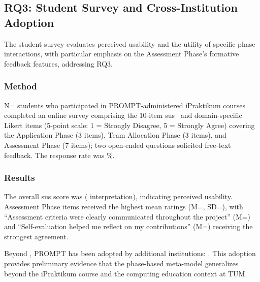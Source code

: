 \subsection{RQ3: Student Survey and Cross-Institution Adoption}

The student survey evaluates perceived usability and the utility of specific phase interactions, with particular emphasis on the Assessment Phase's formative feedback features, addressing RQ3.

\subsubsection{Method}

N=\missing{} students who participated in PROMPT-administered iPraktikum courses completed an online survey comprising the 10-item \acrfull{sus}~\cite{sus} and \missing{} domain-specific Likert items (5-point scale: 1 = Strongly Disagree, 5 = Strongly Agree) covering the Application Phase (3 items), Team Allocation Phase (3 items), and Assessment Phase (7 items);
two open-ended questions solicited free-text feedback.
The response rate was \missing{}\%.

\subsubsection{Results}

\begin{findingBox}
The overall \acrshort{sus} score was \missing{} (\missing{} interpretation), indicating \missing{} perceived usability.
Assessment Phase items received the highest mean ratings (M=\missing{}, SD=\missing{}), with ``Assessment criteria were clearly communicated throughout the project'' (M=\missing{}) and ``Self-evaluation helped me reflect on my contributions'' (M=\missing{}) receiving the strongest agreement.
\end{findingBox}

Beyond \university{}, PROMPT has been adopted by \missing{} additional institutions: \missing{}.
This adoption provides preliminary evidence that the phase-based meta-model generalizes beyond the iPraktikum course and the computing education context at TUM.
